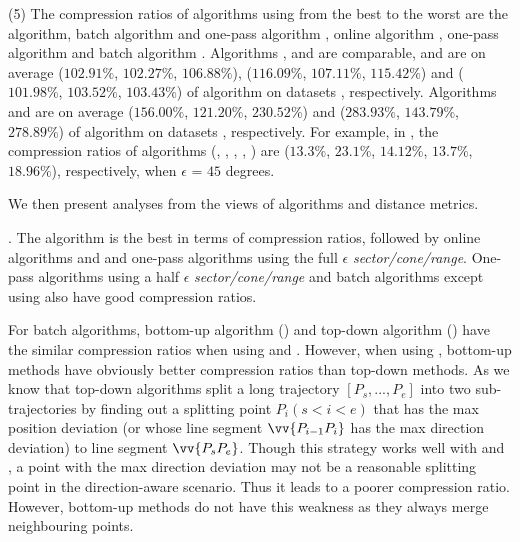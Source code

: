 \sstab(5) The compression ratios of algorithms using \dad from the best
to the worst are the \opt algorithm, batch algorithm \tpa and
one-pass algorithm \interval, online algorithm \opwa, one-pass algorithm \intersec and batch algorithm \dpa.
%
{Algorithms \tpa, \opwa and \interval are comparable, and are on average
($102.91\%$, $102.27\%$, $106.88\%$), ($116.09\%$, $107.11\%$, $115.42\%$) and ($101.98\%$, $103.52\%$, $103.43\%$)
 of algorithm \opt on datasets \dSets, respectively.}
%
{Algorithms \intersec and \dpa are on average ($156.00\%$, $121.20\%$, $230.52\%$) and ($283.93\%$, $143.79\%$, $278.89\%$)
 of algorithm \opt on datasets \dSets, respectively.}
%
For example, in \mopsi, the compression ratios of algorithms (\tpa, \dpa, \opwa, \interval, \intersec)
are ($13.3\%$, $23.1\%$, $14.12\%$, $13.7\%$, $18.96\%$), respectively, when $\epsilon$ = $45$ degrees.
%






We then present analyses from the views of \lsa algorithms and distance metrics.


. The \opt algorithm is the best in terms of compression ratios, followed by online algorithms \opwa and \bqsa and one-pass algorithms using the full $\epsilon$ \emph{sector/cone/range}. One-pass algorithms using a half $\epsilon$ \emph{sector/cone/range} and batch algorithms except \dpa using \dad also have good compression ratios.



For batch algorithms, bottom-up algorithm (\tpa) and top-down algorithm (\dpa) have the similar compression ratios when using \ped and \sed. However, when using \dad, bottom-up methods have obviously better compression ratios than top-down methods.  As we know that top-down algorithms split a long trajectory $[P_s, ..., P_e]$ into two sub-trajectories by finding out a splitting point $P_i (s<i<e)$ that has the max position deviation (or whose line segment $\vv{P_{i-1}P_{i}}$ has the max direction deviation) to line segment $\vv{P_sP_{e}}$. Though this strategy works well with \ped and \sed, a point with the max direction deviation may not be a reasonable splitting point in the direction-aware scenario. Thus it leads to a poorer compression ratio. However, bottom-up methods do not have this weakness as they always merge neighbouring points.



